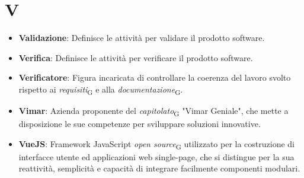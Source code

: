 \section*{V}  
\begin{itemize}
    \item \textbf{Validazione}: Definisce le attività per validare il prodotto software.
    \item \textbf{Verifica}: Definisce le attività per verificare il prodotto software.
    \item \textbf{Verificatore}: Figura incaricata di controllare la coerenza del lavoro svolto rispetto ai \textit{requisiti}\textsubscript{G} e alla \textit{documentazione}\textsubscript{G}.
    \item \textbf{Vimar}: Azienda proponente del \textit{capitolato}\textsubscript{G} "Vimar Geniale", che mette a disposizione le sue competenze per sviluppare soluzioni innovative.
    \item \textbf{VueJS}: Framework JavaScript \textit{open source}\textsubscript{G} utilizzato per la costruzione di interfacce utente ed applicazioni web single-page, che si distingue per la sua reattività, semplicità e capacità di integrare facilmente componenti modulari.
\end{itemize}
